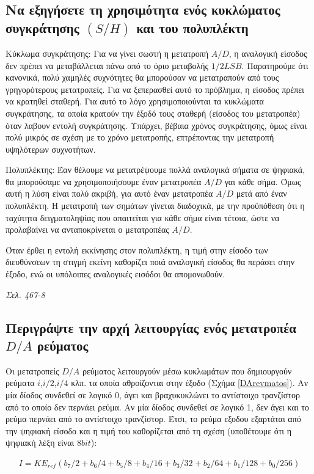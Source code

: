 \documentclass{article}
\begin{document}
\subsection{Να εξηγήσετε τη χρησιμότητα ενός κυκλώματος συγκράτησης $(S/H)$ και του πολυπλέκτη}
Κύκλωμα συγκράτησης: Για να γίνει σωστή η μετατροπή $A/D$, η αναλογική είσοδος δεν πρέπει να μεταβάλλεται πάνω από το όριο μεταβολής $1/2LSB$. Παρατηρούμε ότι κανονικά,
πολύ χαμηλές συχνότητες θα μπορούσαν να μετατραπούν από τους γρηγορότερους μετατροπείς. Για να ξεπερασθεί αυτό το πρόβλημα, η είσοδος πρέπει να κρατηθεί σταθερή. Για
αυτό το λόγο χρησιμοποιούνται τα κυκλώματα συγκράτησης, τα οποία κρατούν την έξοδό τους σταθερή (είσοδος του μετατροπέα) όταν λαβουν εντολή συγκράτησης. Υπάρχει, 
βέβαια χρόνος συγκράτησης, όμως είναι πολύ μικρός σε σχέση με το χρόνο μετατροπής, επτρέποντας την μετατροπή υψηλότερων συχνοτήτων.

Πολυπλέκτης: Έαν θέλουμε να μετατρέψουμε πολλά αναλογικά σήματα σε ψηφιακά, θα μπορούσαμε να χρησιμοποιήσουμε έναν μετατροπέα $A/D$ γαι κάθε σήμα. Όμως αυτή η λύση είναι
πολύ ακριβή, για αυτό έναν μετατροπέα $A/D$ μετά από έναν πολυπλέκτη. Η μετατροπή των σημάτων γίνεται διαδοχικά, με την προϋπόθεση ότι η ταχύτητα δειγματοληψίας που
απαιτείται για κάθε σήμα είναι τέτοια, ώστε να προλαβαίνει να ανταποκρίνεται ο μετατροπέας $A/D$.

Όταν έρθει η εντολή εκκίνησης στον πολυπλέκτη, η τιμή στην είσοδο των διευθύνσεων τη στιγμή εκείνη καθορίζει ποιά αναλογική είσοδος θα περάσει στην έξοδο, ενώ οι 
υπόλοιπες αναλογικές εισόδοι θα απομονωθούν.

\emph{Σελ. 467-8}

\subsection{Περιγράψτε την αρχή λειτουργίας ενός μετατροπέα $D/A$ ρεύματος}
Οι μετατροπείς $D/A$ ρεύματος λειτουργούν μέσω κυκλωμάτων που δημιουργούν ρεύματα $i$,$i/2$,$i/4$ κλπ. τα οποία αθροίζονται στην έξοδο (Σχήμα \ref{DArevmatos}). Αν μία δίοδος συνδεθεί σε λογικό 0, άγει και 
βραχυκυκλώνει το αντίστοιχο τρανζίστορ από το οποίο δεν περνάει ρεύμα. Αν μία δίοδος συνδεθεί σε λογικό 1, δεν άγει και το ρεύμα περνάει από το αντίστοιχο τρανζίστορ. Έτσι, το 
ρεύμα εξοδου εξαρτάται από την ψηφιακή είσοδο και η τιμή του καθορίζεται από τη σχέση (υποθέτουμε ότι η ψηφιακή λέξη είναι $8 bit$):

\begin{align*}
    I = K E_{ref} \left( b_7/2 + b_6/4 + b_5/8 + b_4/16 +b_3/32 + b_2/64 + b_1/128 + b_0/256 \right)
\end{align*}
\end{document}
